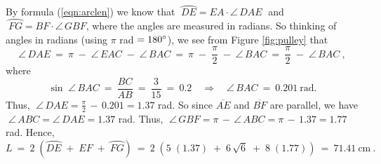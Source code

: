 \begin{exmp}
 By formula (\ref{eqn:arclen}) we know that $\;\wideparen{DE} = EA \cdot \angle\,DAE\;$ and
 $\;\wideparen{FG} = BF \cdot \angle\,GBF$, where the angles are measured in radians. So thinking
 of angles in radians (using $\pi$ rad $= 180^\circ$), we see from Figure \ref{fig:pulley} that 
 \begin{displaymath}
  \angle\,DAE ~=~ \pi \;-\; \angle\,EAC \;-\; \angle\,BAC ~=~ \pi \;-\; \frac{\pi}{2} \;-\;
   \angle\,BAC ~=~ \frac{\pi}{2} \;-\; \angle\,BAC ~,
 \end{displaymath}
 where
 \begin{displaymath}
  \sin\;\angle\,BAC ~=~ \frac{BC}{AB} ~=~ \frac{3}{15} ~=~ 0.2 \quad\Rightarrow\quad
  \angle\,BAC ~=~ 0.201~\text{rad.}
 \end{displaymath}
 Thus, $\;\angle\,DAE = \frac{\pi}{2} \,-\, 0.201 = 1.37$ rad. So since $\overline{AE}$ and
 $\overline{BF}$ are parallel, we have $\;\angle\,ABC = \angle\,DAE = 1.37$ rad. Thus,
 $\;\angle\,GBF = \pi \,-\, \angle\,ABC = \pi \,-\, 1.37 = 1.77$ rad. Hence,
 \begin{displaymath}
  L ~=~ 2\;(\wideparen{DE} \;+\; EF \;+\; \wideparen{FG}) ~=~ 2\;(5\;(1.37) \;+\; 6\,\sqrt{6} \;+\;
   8\;(1.77)) ~=~ \boxed{71.41~\text{cm}} ~.
 \end{displaymath}
\end{exmp}
\divider
\newpage
\startexercises\label{sec4dot2}
\vspace{5mm}
